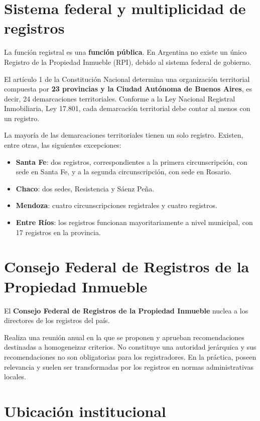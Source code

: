 \documentclass[12pt,oneside]{book}
\begin{document}
\section{Sistema federal y multiplicidad de registros}

La función registral es una \textbf{función pública}. En Argentina no existe un único Registro de la Propiedad Inmueble (RPI), debido al sistema federal de gobierno.

El artículo 1 de la Constitución Nacional determina una organización territorial compuesta por \textbf{23 provincias y la Ciudad Autónoma de Buenos Aires}, es decir, 24 demarcaciones territoriales. Conforme a la Ley Nacional Registral Inmobiliaria, Ley 17.801, cada demarcación territorial debe contar al menos con un registro.

La mayoría de las demarcaciones territoriales tienen un solo registro. Existen, entre otras, las siguientes excepciones:

\begin{itemize}
    \item \textbf{Santa Fe}: dos registros, correspondientes a la primera circunscripción, con sede en Santa Fe, y a la segunda circunscripción, con sede en Rosario.
    \item \textbf{Chaco}: dos sedes, Resistencia y Sáenz Peña.
    \item \textbf{Mendoza}: cuatro circunscripciones registrales y cuatro registros.
    \item \textbf{Entre Ríos}: los registros funcionan mayoritariamente a nivel municipal, con 17 registros en la provincia.
\end{itemize}

\section{Consejo Federal de Registros de la Propiedad Inmueble}

El \textbf{Consejo Federal de Registros de la Propiedad Inmueble} nuclea a los directores de los registros del país.

Realiza una reunión anual en la que se proponen y aprueban recomendaciones destinadas a homogeneizar criterios. No constituye una autoridad jerárquica y sus recomendaciones no son obligatorias para los registradores. En la práctica, poseen relevancia y suelen ser transformadas por los registros en normas administrativas locales.

\section{Ubicación institucional}
\end{document}
